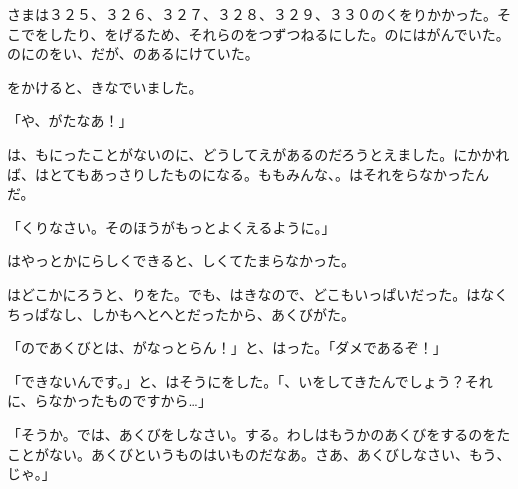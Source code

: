 さまは３２５、３２６、３２７、３２８、３２９、３３０のくをりかかった。そこでをしたり、をげるため、それらのをつずつねるにした。のにはがんでいた。のにのをい、だが、のあるにけていた。

をかけると、きなでいました。

「や、がたなあ！」

は、もにったことがないのに、どうしてえがあるのだろうとえました。にかかれば、はとてもあっさりしたものになる。ももみんな、。はそれをらなかったんだ。

「くりなさい。そのほうがもっとよくえるように。」

はやっとかにらしくできると、しくてたまらなかった。

はどこかにろうと、りをた。でも、はきなので、どこもいっぱいだった。はなくちっぱなし、しかもへとへとだったから、あくびがた。

「のであくびとは、がなっとらん！」と、はった。「ダメであるぞ！」

「できないんです。」と、はそうにをした。「、いをしてきたんでしょう？それに、らなかったものですから…」

「そうか。では、あくびをしなさい。する。わしはもうかのあくびをするのをたことがない。あくびというものはいものだなあ。さあ、あくびしなさい、もう、じゃ。」

